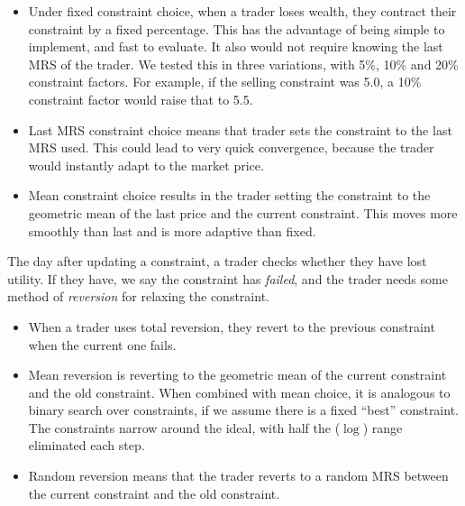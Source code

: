 \documentclass[12pt,a4paper,titlepage]{article}
\newcommand{\co}[1]{\textsf{#1}}
\begin{document}
\begin{itemize}
  \item Under \co{fixed} constraint choice, when a trader loses wealth, they contract their constraint by a fixed percentage.
    This has the advantage of being simple to implement, and fast to evaluate.
    It also would not require knowing the last MRS of the trader.
    We tested this in three variations, with 5\%, 10\% and 20\% constraint factors.
    For example, if the selling constraint was 5.0, a 10\% constraint factor would raise that to 5.5.
    
  \item \co{Last} MRS constraint choice means that trader sets the constraint to the last MRS used.
    This could lead to very quick convergence, because the trader would instantly adapt to the market price.

  \item \co{Mean} constraint choice results in the trader setting the constraint to the geometric mean of the last price and the current constraint.
This moves more smoothly than \co{last} and is more adaptive than \co{fixed}.

\end{itemize}

The day after updating a constraint, a trader checks whether they have lost utility.
If they have, we say the constraint has \textit{failed}, and the trader needs some method of \textit{reversion} for relaxing the constraint.

\begin{itemize}

  \item When a trader uses \co{total} reversion, they revert to the previous constraint when the current one fails.

  \item \co{Mean} reversion is reverting to the geometric mean of the current constraint and the old constraint.
When combined with \co{mean} choice, it is analogous to binary search over constraints, if we assume there is a fixed ``best'' constraint.
The constraints narrow around the ideal, with half the ($\log$) range eliminated each step.

  \item \co{Random} reversion means that the trader reverts to a random MRS between the current constraint and the old constraint.

\end{itemize}
\end{document}
